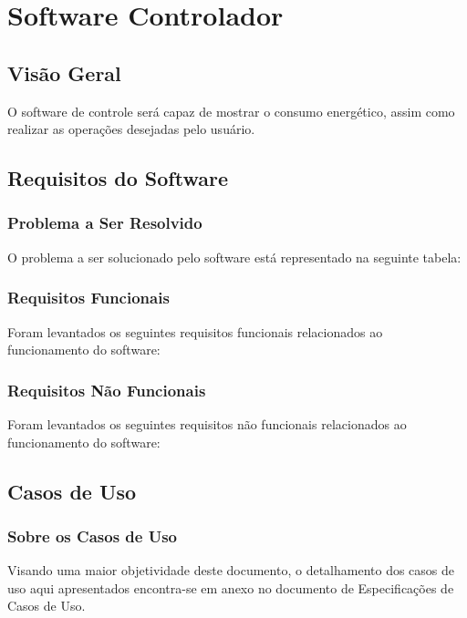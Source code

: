 \section{Software Controlador}

\subsection{Visão Geral}
\par O software de controle será capaz de mostrar o consumo energético, assim como realizar as operações desejadas pelo usuário.

\subsection{Requisitos do Software}

\subsubsection{Problema a Ser Resolvido}
\par O problema a ser solucionado pelo software está representado na seguinte tabela:


\subsubsection{Requisitos Funcionais}
\par Foram levantados os seguintes requisitos funcionais relacionados ao funcionamento do software:


\subsubsection{Requisitos Não Funcionais}
\par Foram levantados os seguintes requisitos não funcionais relacionados ao funcionamento do software:


\subsection{Casos de Uso}

\subsubsection{Sobre os Casos de Uso}
\par Visando uma maior objetividade deste documento, o detalhamento dos casos de uso aqui apresentados encontra-se em anexo no documento de Especificações de Casos de Uso.

